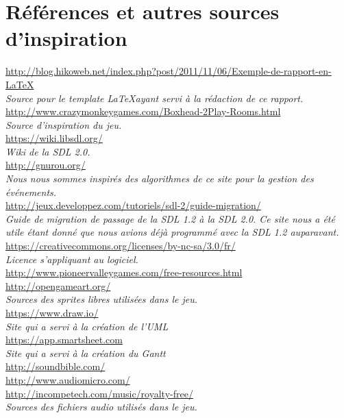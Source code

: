 \section*{Références et autres sources d'inspiration}

\url{http://blog.hikoweb.net/index.php?post/2011/11/06/Exemple-de-rapport-en-LaTeX} \\
\emph{Source pour le template \LaTeX ayant servi à la rédaction de ce rapport.} \\

\url{http://www.crazymonkeygames.com/Boxhead-2Play-Rooms.html} \\
\emph{Source d'inspiration du jeu.} \\

\url{https://wiki.libsdl.org/} \\
\emph{Wiki de la SDL 2.0.} \\

\url{http://gnurou.org/} \\
\emph{Nous nous sommes inspirés des algorithmes de ce site pour la gestion des événements.} \\

\url{http://jeux.developpez.com/tutoriels/sdl-2/guide-migration/} \\
\emph{Guide de migration de passage de la SDL 1.2 à la SDL 2.0. Ce site nous a été utile étant donné
que nous avions déjà programmé avec la SDL 1.2 auparavant.} \\

\url{https://creativecommons.org/licenses/by-nc-sa/3.0/fr/} \\
\emph{Licence s'appliquant au logiciel.} \\

\url{http://www.pioneervalleygames.com/free-resources.html} \\
\url{http://opengameart.org/} \\
\emph{Sources des sprites libres utilisées dans le jeu.} \\

\url{https://www.draw.io/} \\
\emph{Site qui a servi à la création de l'UML} \\

\url{https://app.smartsheet.com} \\
\emph{Site qui a servi à la création du Gantt} \\

\url{http://soundbible.com/} \\
\url{http://www.audiomicro.com/} \\
\url{http://incompetech.com/music/royalty-free/} \\
\emph{Sources des fichiers audio utilisés dans le jeu.} \\

